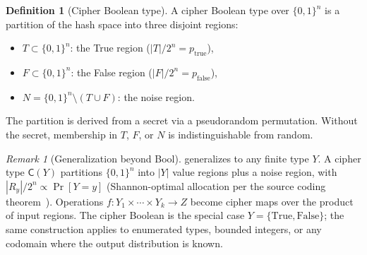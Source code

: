 \documentclass[11pt]{article}
\theoremstyle{definition}
\newtheorem{definition}{Definition}[section]
\theoremstyle{plain}
\theoremstyle{remark}
\newtheorem{remark}{Remark}[section]
\newcommand{\cipher}[1]{\mathsf{C}(#1)}
\newcommand{\B}{\{0,1\}}
\begin{document}
\begin{definition}[Cipher Boolean type]
\label{def:cipher-bool}
A cipher Boolean type over $\B^n$ is a partition of the hash space into
three disjoint regions:
\begin{itemize}
\item $T \subset \B^n$: the True region ($|T| / 2^n = p_{\mathrm{true}}$),
\item $F \subset \B^n$: the False region ($|F| / 2^n = p_{\mathrm{false}}$),
\item $N = \B^n \setminus (T \cup F)$: the noise region.
\end{itemize}
The partition is derived from a secret via a pseudorandom permutation.
Without the secret, membership in $T$, $F$, or $N$ is indistinguishable
from random.
\end{definition}

\begin{remark}[Generalization beyond Bool]
\label{rem:general-cipher-type}
 generalizes to any finite type $Y$.
A cipher type $\cipher{Y}$ partitions $\B^n$ into $|Y|$ value regions
plus a noise region, with $|R_y|/2^n \propto \Pr[Y = y]$
(Shannon-optimal allocation per the source coding
theorem~\cite{shannon1948mathematical}).
Operations $f : Y_1 \times \cdots \times Y_k \to Z$ become cipher maps
over the product of input regions.
The cipher Boolean is the special case $Y = \{\mathrm{True},
\mathrm{False}\}$; the same construction applies to enumerated types,
bounded integers, or any codomain where the output distribution is known.
\end{remark}
\end{document}
